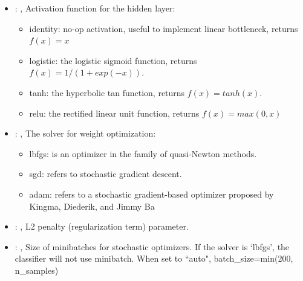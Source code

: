 \begin{itemize}
    \item {}: ,
      Activation function for the hidden layer:
      \begin{itemize}                                                    \item identity:  no-op
      activation, useful to implement linear bottleneck, returns $f(x) = x$
      \item logistic: the logistic sigmoid function, returns $f(x) = 1 / (1 + exp(-x))$.
      \item tanh: the hyperbolic tan function, returns $f(x) = tanh(x)$.
      \item relu:  the rectified linear unit function, returns $f(x) = max(0, x)$
      \end{itemize}

    \item {}: ,
      The solver for weight optimization:
      \begin{itemize}                                                    \item lbfgs: is an
      optimizer in the family of quasi-Newton methods.
      \item sgd: refers to stochastic gradient descent.
      \item adam: refers to a stochastic gradient-based optimizer proposed by Kingma, Diederik, and
      Jimmy Ba                                                  \end{itemize}

    \item {}: ,
      L2 penalty (regularization term) parameter.

    \item {}: ,
      Size of minibatches for stochastic optimizers. If the solver is `lbfgs',
      the classifier will not use minibatch. When set to ``auto", batch\_size=min(200, n\_samples)


\end{itemize}
